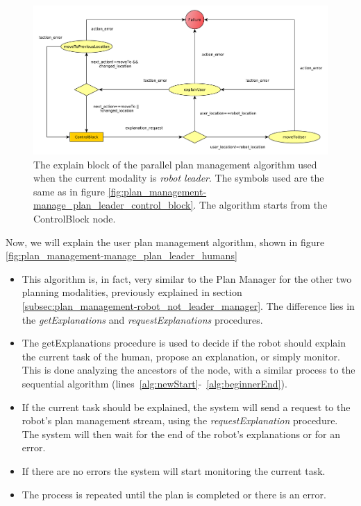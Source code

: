 \begin{figure}[ht!]
 \centering
 \includegraphics[scale=0.5]{img/plan_management/manage_plan_leader_explanation_block.pdf}
 \caption[The explain block of the parallel plan management algorithm]{The explain block of the parallel plan management algorithm used when the current modality is \textit{robot leader}. The symbols used are the same as in figure \ref{fig:plan_management-manage_plan_leader_control_block}. The algorithm starts from the ControlBlock node.}
 \label{fig:plan_management-manage_plan_leader_explain_block}
 \end{figure}


Now, we will explain the user plan management algorithm, shown in figure \ref{fig:plan_management-manage_plan_leader_humans}
\begin{itemize}
\item This algorithm is, in fact, very similar to the Plan Manager for the other two planning modalities, previously explained in section \ref{subsec:plan_management-robot_not_leader_manager}. The difference lies in the \textit{getExplanations} and \textit{requestExplanations} procedures.
\item The getExplanations procedure is used to decide if the robot should explain the current task of the human, propose an explanation, or simply monitor. This is done analyzing the ancestors of the node, with a similar process to the sequential algorithm (lines~\ref{alg:newStart}-~\ref{alg:beginnerEnd}).
\item If the current task should be explained, the system will send a request to the robot's plan management stream, using the \textit{requestExplanation} procedure. The system will then wait for the end of the robot's explanations or for an error.
\item If there are no errors the system will start monitoring the current task.
\item The process is repeated until the plan is completed or there is an error.
\end{itemize}



